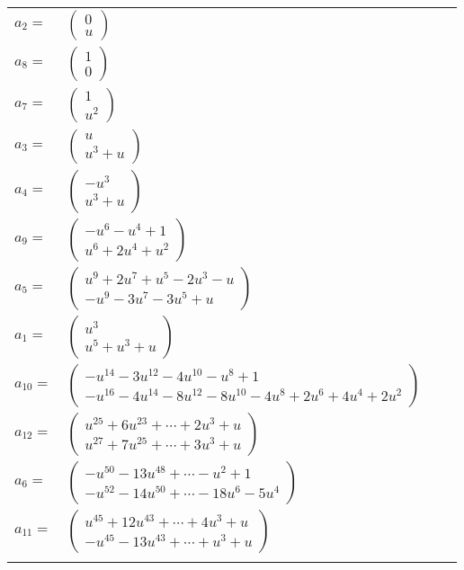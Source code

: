 \documentclass[1p]{elsarticle_modified}
\theoremstyle{definition}
\begin{document}
\begin{tabular}{m{7pt} m{180pt} m{7pt} m{180pt} }
\flushright $a_{2}=$&$\begin{pmatrix}0\\u\end{pmatrix}$ \\
\flushright $a_{8}=$&$\begin{pmatrix}1\\0\end{pmatrix}$ \\
\flushright $a_{7}=$&$\begin{pmatrix}1\\u^2\end{pmatrix}$ \\
\flushright $a_{3}=$&$\begin{pmatrix}u\\u^3+u\end{pmatrix}$ \\
\flushright $a_{4}=$&$\begin{pmatrix}- u^3\\u^3+u\end{pmatrix}$ \\
\flushright $a_{9}=$&$\begin{pmatrix}- u^6- u^4+1\\u^6+2 u^4+u^2\end{pmatrix}$ \\
\flushright $a_{5}=$&$\begin{pmatrix}u^9+2 u^7+u^5-2 u^3- u\\- u^9-3 u^7-3 u^5+u\end{pmatrix}$ \\
\flushright $a_{1}=$&$\begin{pmatrix}u^3\\u^5+u^3+u\end{pmatrix}$ \\
\flushright $a_{10}=$&$\begin{pmatrix}- u^{14}-3 u^{12}-4 u^{10}- u^8+1\\- u^{16}-4 u^{14}-8 u^{12}-8 u^{10}-4 u^8+2 u^6+4 u^4+2 u^2\end{pmatrix}$ \\
\flushright $a_{12}=$&$\begin{pmatrix}u^{25}+6 u^{23}+\cdots+2 u^3+u\\u^{27}+7 u^{25}+\cdots+3 u^3+u\end{pmatrix}$ \\
\flushright $a_{6}=$&$\begin{pmatrix}- u^{50}-13 u^{48}+\cdots- u^2+1\\- u^{52}-14 u^{50}+\cdots-18 u^6-5 u^4\end{pmatrix}$ \\
\flushright $a_{11}=$&$\begin{pmatrix}u^{45}+12 u^{43}+\cdots+4 u^3+u\\- u^{45}-13 u^{43}+\cdots+u^3+u\end{pmatrix}$\\&\end{tabular}
\end{document}
